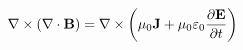\documentclass[preview]{standalone}
\begin{document}
\begin{align*}
\nabla \times \left(\nabla \cdot \mathbf{B}\right) = \nabla \times \left(\mu_{0}\mathbf{J} + \mu_{0}\varepsilon_{0} \pdv{\mathbf{E}}{t} \right)
\end{align*}
\end{document}
